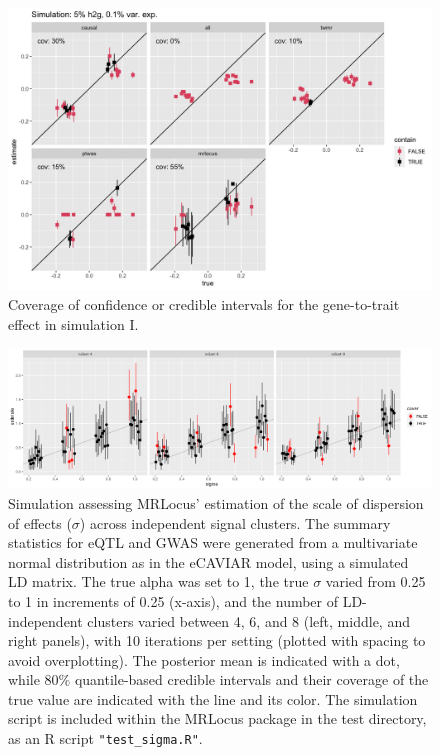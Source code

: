 \documentclass[11pt]{article}
\begin{document}
\begin{figure}[!ht]
  \centering
  \includegraphics[width=.8\textwidth]{figs/cover9.png}
  \caption{Coverage of confidence or credible intervals for the
    gene-to-trait effect in simulation I.}
\end{figure}

\begin{figure}[!ht]
  \centering
  \includegraphics[width=\textwidth]{figs/sigma_est.png}
  \caption{Simulation assessing MRLocus' estimation of the scale of
    dispersion of effects ($\sigma$) across independent signal
    clusters. The summary statistics for eQTL and GWAS were generated from
    a multivariate normal distribution as in the eCAVIAR model, using
    a simulated LD matrix. The true alpha was set to 1, the true $\sigma$
    varied from 0.25 to 1 in increments of 0.25 (x-axis), and the
    number of LD-independent clusters varied between 4, 6, and 8
    (left, middle, and right panels), with 10 iterations per setting
    (plotted with spacing to avoid overplotting). The posterior mean
    is indicated with a dot, while 80\% quantile-based credible
    intervals and their coverage of the true value are indicated with
    the line and its color. The simulation script is included within
    the MRLocus package in the test directory, as an R script
    \texttt{"test\_sigma.R"}.} 
\end{figure}
\end{document}
